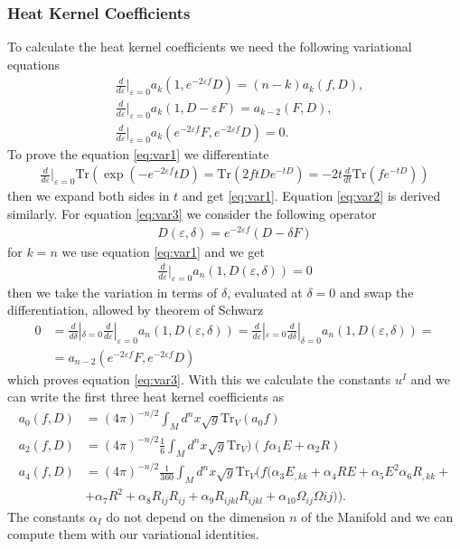 \subsubsection{Heat Kernel Coefficients}
To calculate the heat kernel coefficients we need the following variational
equations
\begin{align}
    &\frac{d}{d\varepsilon}|_{\varepsilon=0}a_k(1, e^{-2\varepsilon f}D) =
    (n-k) a_k(f, D),\label{eq:var1}\\
    &\frac{d}{d\varepsilon}|_{\varepsilon=0}a_k(1, D-\varepsilon F) =
    a_{k-2}(F,D),\label{eq:var2}\\
    &\frac{d}{d\varepsilon}|_{\varepsilon=0}a_k(e^{-2\varepsilon f}F,
    e^{-2\varepsilon f}D) =
    0\label{eq:var3}.
\end{align}
To prove the equation \ref{eq:var1} we differentiate
\begin{align}
    \frac{d}{d\varepsilon}|_{\varepsilon=0} \text{Tr}(\exp(-e^{-2\varepsilon
    f}tD) = \text{Tr}(2ftDe^{-tD}) = -2t\frac{d}{dt}\text{Tr}(fe^{-tD}))
\end{align}
then we expand both sides in $t$ and get \ref{eq:var1}. Equation \ref{eq:var2}
is derived similarly. For equation \ref{eq:var3} we consider the following
operator
\begin{align}
    D(\varepsilon,\delta) = e^{-2\varepsilon f}(D-\delta F)
\end{align}
for $k=n$ we use equation \ref{eq:var1} and we get
\begin{align}
    \frac{d}{d\varepsilon}|_{\varepsilon=0}a_n(1,D(\varepsilon,\delta)) =0
\end{align}
then we take the variation in terms of $\delta$, evaluated at $\delta =0$ and
swap the differentiation, allowed by theorem of Schwarz
\begin{align}
    0 &=
    \frac{d}{d\delta}|_{\delta=0}\frac{d}{d\varepsilon}|_{\varepsilon=0}a_n(1,
    D(\varepsilon,\delta)) =
    \frac{d}{d\varepsilon}|_{\varepsilon=0}\frac{d}{d\delta}|_{\delta=0}a_n(1,
    D(\varepsilon,\delta)) =\\
    &=a_{n-2} ( e^{-2\varepsilon f}F, e^{-2\varepsilon f}D)
\end{align}
which proves equation \ref{eq:var3}. With this we calculate the constants $u^I$
and we can write the first three heat kernel coefficients as
\begin{align}
    a_0(f, D) &= (4\pi)^{-n/2}\int_Md^n x\sqrt{g} \text{Tr}_V(a_0 f)\\
    a_2(f, D) &= (4\pi)^{-n/2}\frac{1}{6}\int_Md^n
    x\sqrt{g}\text{Tr}_V)(f\alpha _1 E+\alpha _2 R)\\
    a_4(f, D) &= (4\pi)^{-n/2}\frac{1}{360}\int_Md^n
    x\sqrt{g}\text{Tr}_V(f(\alpha_3 E_{,kk} + \alpha_4 RE + \alpha_5 E^2
    \alpha_6 R_{,kk} + \\
    &+\alpha_7 R^2 + \alpha_8 R_{ij}R_{ij} + \alpha_9
    R_{ijkl}R_{ijkl} +\alpha_{10} \Omega_{ij}\Omega{ij})).
\end{align}
The constants $\alpha_I$ do not depend on the dimension $n$ of the Manifold and
we can compute them with our variational identities.

